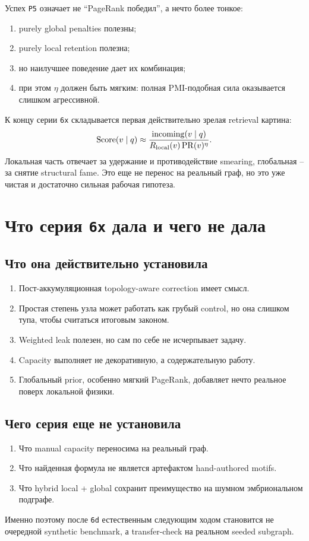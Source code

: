Успех \texttt{P5} означает не ``PageRank победил'', а нечто более тонкое:

\begin{enumerate}[leftmargin=2em]
\item purely global penalties полезны;
\item purely local retention полезна;
\item но наилучшее поведение дает их комбинация;
\item при этом $\eta$ должен быть мягким: полная PMI-подобная сила оказывается
слишком агрессивной.
\end{enumerate}

\begin{takeaway}
К концу серии \texttt{6x} складывается первая действительно зрелая retrieval
картина:
\[
\mathrm{Score}(v\mid q)\approx
\frac{\mathrm{incoming}(v\mid q)}{R_{\mathrm{local}}(v)\,\mathrm{PR}(v)^\eta}.
\]
Локальная часть отвечает за удержание и противодействие smearing, глобальная --
за снятие structural fame. Это еще не перенос на реальный граф, но это уже
чистая и достаточно сильная рабочая гипотеза.
\end{takeaway}

\section{Что серия \texttt{6x} дала и чего не дала}

\subsection{Что она действительно установила}

\begin{enumerate}[leftmargin=2em]
\item Пост-аккумуляционная topology-aware correction имеет смысл.
\item Простая степень узла может работать как грубый control, но она слишком
тупа, чтобы считаться итоговым законом.
\item Weighted leak полезен, но сам по себе не исчерпывает задачу.
\item Capacity выполняет не декоративную, а содержательную работу.
\item Глобальный prior, особенно мягкий PageRank, добавляет нечто реальное поверх
локальной физики.
\end{enumerate}

\subsection{Чего серия еще не установила}

\begin{enumerate}[leftmargin=2em]
\item Что manual capacity переносима на реальный граф.
\item Что найденная формула не является артефактом hand-authored motifs.
\item Что hybrid local + global сохранит преимущество на шумном эмбриональном
подграфе.
\end{enumerate}

Именно поэтому после \texttt{6d} естественным следующим ходом становится не
очередной synthetic benchmark, а transfer-check на реальном seeded subgraph.

